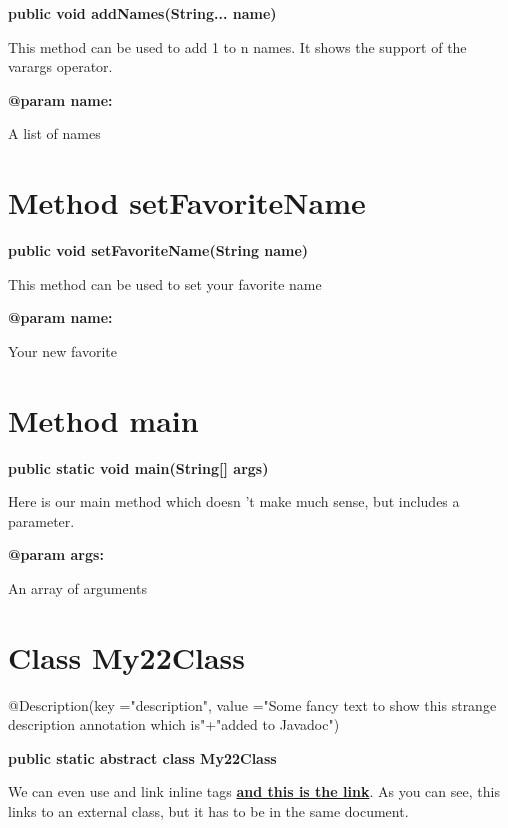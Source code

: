 \documentclass[12pt]{scrreprt}
\begin{document}
\textbf{public void addNames(String... name)}


This method can be used to add 1 to n names. It shows the support of the varargs operator.



\textbf{@param name:}

\quad\quad A list of names



\section{Method setFavoriteName}
\label{examples.SimpleExample:setFavoriteName}




\textbf{public void setFavoriteName(String name)}


This method can be used to set your favorite name



\textbf{@param name:}

\quad\quad Your new favorite



\section{Method main}
\label{examples.SimpleExample:main}




\textbf{public static void main(String[] args)}


Here is our main method which doesn 't make much sense, but includes a parameter.



\textbf{@param args:}

\quad\quad An array of arguments



\section{Class My22Class}
\label{examples.SimpleExample.My22Class}

@Description(key ="description", value ="Some fancy text to show this strange description annotation which is"+"added to Javadoc")



\textbf{public static abstract class My22Class}


We can even use and link inline tags \hyperref[examples.AnotherClass]{\textbf{\color{inlineTagLink} and this is the link}}. As you can see, this links to an external class, but it has to be in the same document.
\end{document}
